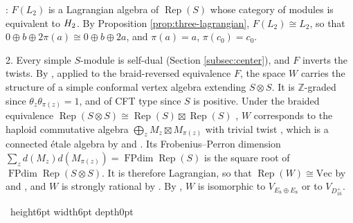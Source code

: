 \documentclass[leqno]{article}
\let\cal\relax
\newcommand{\cal}{\mathcal}
\newcommand{\Z}{\ensuremath{\mathbb{Z}}}
\newcommand{\qed}{\hfill \vrule height6pt  width6pt depth0pt}
\newcommand{\ot}{\otimes}
\DeclareMathOperator{\Rep}{Rep} %
\newenvironment{proof}[1][]{\noindent {\it Proof #1} : }{\hbox{~}\qed
\smallskip
}
\numberwithin{equation}{section}
\begin{document}
\begin{proof}
$F(L_2)$ is a Lagrangian algebra of $\Rep(S)$ whose category of modules is equivalent to $\cal H_2$. By Proposition \ref{prop:three-lagrangian}, $F(L_2) \cong L_2$, so that $0 \oplus b \oplus 2\pi(a) \cong 0 \oplus b \oplus 2a$, and $\pi(a) = a$, $\pi(c_0) = c_0$.

2. Every simple $S$-module is self-dual (Section \ref{subsec:center}), and $F$ inverts the twists. By \cite[Main Theorem 3 pp.~4--5 and Theorem 5.10 p.~51]{CKM22}, applied to the braid-reversed equivalence $F$, the space $W$ carries the structure of a simple conformal vertex algebra extending $S \ot S$. It is $\Z$-graded since $\theta_z\theta_{\pi(z)} = 1$, and of CFT type since $S$ is positive. Under the braided equivalence $\Rep(S \ot S) \cong \Rep(S) \boxtimes \Rep(S)$ \cite[Theorem 5.5 p.~48]{CKM22}, $W$ corresponds to the haploid commutative algebra $\bigoplus_z M_z \boxtimes M_{\pi(z)}$ with trivial twist \cite[Theorem 3.2 p.~10]{HKL15}, which is a connected \'etale algebra by \cite[Theorem 5.12 p.~52 and its proof]{CKM22} and \cite[Proposition 2.7 p.~5]{DMNO13}. Its Frobenius--Perron dimension $\sum_z d(M_z)d(M_{\pi(z)}) = \operatorname{FPdim}\Rep(S)$ is the square root of $\operatorname{FPdim}\Rep(S \ot S)$. It is therefore Lagrangian, so that $\Rep(W) \cong \mathrm{Vec}$ by \cite[Theorem 3.4 p.~16]{HKL15} and \cite[Remark 4.3 p.~16]{DMNO13}, and $W$ is strongly rational by \cite[Corollary 5.13 p.~53]{CKM22}. By \cite[Theorem 2 p.~2]{DoM04b}, $W$ is isomorphic to $V_{E_8 \oplus E_8}$ or to $V_{D_{16}^+}$.

\end{proof}
\end{document}
